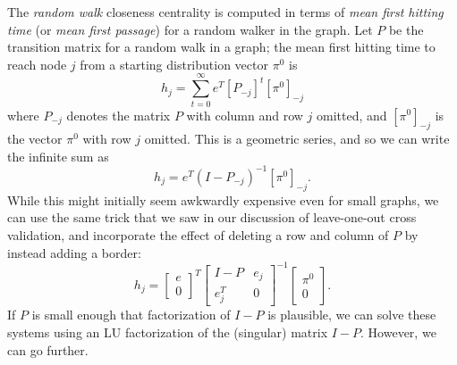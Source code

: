 \documentclass[12pt, leqno]{article} %
\begin{document}
The {\em random walk} closeness centrality is computed in terms of
{\em mean first hitting time} (or {\em mean first passage}) for a
random walker in the graph.  Let $P$ be the transition matrix for a
random walk in a graph; the mean first hitting time to reach node $j$
from a starting distribution vector $\pi^0$ is
\[
  h_j = \sum_{t=0}^\infty e^T [P_{-j}]^t [\pi^0]_{-j}
\]
where $P_{-j}$ denotes the matrix $P$ with column and row $j$ omitted,
and $[\pi^0]_{-j}$ is the vector $\pi^0$ with row $j$ omitted.  This
is a geometric series, and so we can write the infinite sum as
\[
  h_j = e^T (I-P_{-j})^{-1} [\pi^0]_{-j}.
\]
While this might initially seem awkwardly expensive even for small graphs,
we can use the same trick that we saw in our discussion of
leave-one-out cross validation, and incorporate the effect of deleting
a row and column of $P$ by instead adding a border:
\[
  h_j =
  \begin{bmatrix} e \\ 0 \end{bmatrix}^T
  \begin{bmatrix} I-P & e_j \\ e_j^T & 0 \end{bmatrix}^{-1}
  \begin{bmatrix} \pi^0 \\ 0 \end{bmatrix}.
\]
If $P$ is small enough that factorization of $I-P$ is plausible, we
can solve these systems using an LU factorization of the (singular)
matrix $I-P$.  However, we can go further.
\end{document}

